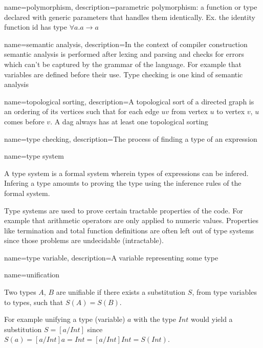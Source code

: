 { name={polymorphism},
  description={parametric polymorphism: a function or type declared with generic parameters that handles them identically. Ex. the identity function id has type $\forall a . a \to a$}
}

{ name={semantic analysis},
  description={In the context of compiler construction semantic analysis is performed after lexing and parsing and checks for errors which can't be captured by the grammar of the language. For example that variables are defined before their use. Type checking is one kind of semantic analysis}
}

{ name={topological sorting},
  description={A topological sort of a directed graph is an ordering of its vertices such that for each edge $uv$ from vertex $u$ to vertex $v$, $u$ comes before $v$. A \acrshort{dag} always has at least one topological sorting}
}

{ name={type checking},
  description={The process of finding a type of an expression}
}

{ name={type system} }
{A type system is a formal system wherein types of expressions can be infered. Infering a type amounts to proving the type using the inference rules of the formal system.

Type systems are used to prove certain tractable properties of the code. For example that arithmetic operators are only applied to numeric values. Properties like termination and total function definitions are often left out of type systems since those problems are undecidable (intractable).
}

{ name={type variable},
  description={A variable representing some type}
}

{ name={unification} }
{Two types $A$, $B$ are unifiable if there exists a substitution $S$, from type variables to types, such that $S(A) = S(B)$.

For example unifying a type (variable) $a$ with the type $Int$ would yield a substitution $S = [a/Int]$ since $S(a) = [a/Int]a = Int = [a/Int]Int = S(Int)$.
}
